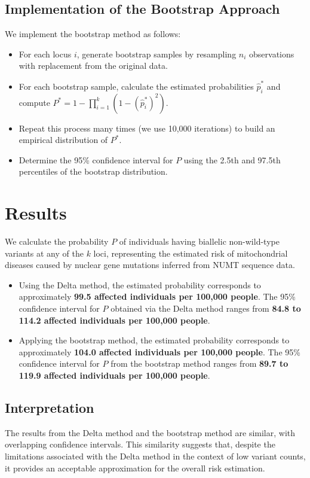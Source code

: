 \documentclass{article}
\begin{document}
\subsection*{Implementation of the Bootstrap Approach}

We implement the bootstrap method as follows:

\begin{itemize}
    \item For each locus \( i \), generate bootstrap samples by resampling \( n_i \) observations with replacement from the original data.
    \item For each bootstrap sample, calculate the estimated probabilities \( \hat{p}_i^* \) and compute \( P^* = 1 - \prod_{i=1}^{k} (1 - (\hat{p}_i^*)^2) \).
    \item Repeat this process many times (we use 10,000 iterations) to build an empirical distribution of \( P^* \).
    \item Determine the 95\% confidence interval for \( P \) using the 2.5th and 97.5th percentiles of the bootstrap distribution.
\end{itemize}

\section*{Results}

We calculate the probability \( P \) of individuals having biallelic non-wild-type variants at any of the \( k \) loci, representing the estimated risk of mitochondrial diseases caused by nuclear gene mutations inferred from NUMT sequence data.

\begin{itemize}
\item Using the Delta method, the estimated probability corresponds to approximately \textbf{99.5 affected individuals per 100,000 people}. The 95\% confidence interval for \( P \) obtained via the Delta method ranges from \textbf{84.8 to 114.2 affected individuals per 100,000 people}.

\item Applying the bootstrap method, the estimated probability corresponds to approximately \textbf{104.0 affected individuals per 100,000 people}. The 95\% confidence interval for \( P \) from the bootstrap method ranges from \textbf{89.7 to 119.9 affected individuals per 100,000 people}.
\end{itemize}

\subsection*{Interpretation}

The results from the Delta method and the bootstrap method are similar, with overlapping confidence intervals. This similarity suggests that, despite the limitations associated with the Delta method in the context of low variant counts, it provides an acceptable approximation for the overall risk estimation.
\end{document}
